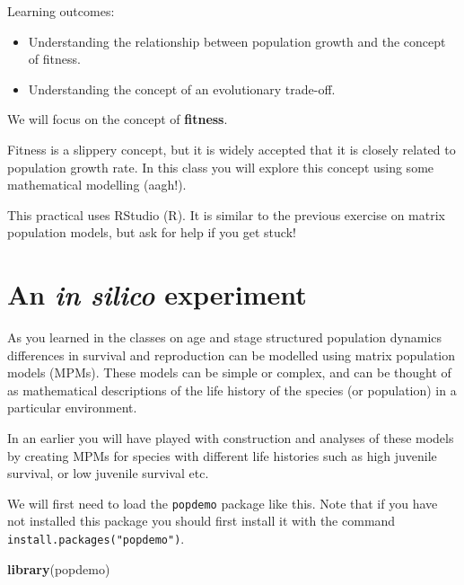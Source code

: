 \documentclass[
  a4paper]{book}
\newenvironment{Shaded}{\begin{snugshade}}{\end{snugshade}}
\newcommand{\FunctionTok}[1]{\textcolor[rgb]{0.13,0.29,0.53}{\textbf{#1}}}
\newcommand{\NormalTok}[1]{#1}
\providecommand{\tightlist}{%
  \setlength{\itemsep}{0pt}\setlength{\parskip}{0pt}}
\begin{document}
\begin{do-something}
Learning outcomes:

\begin{itemize}
\tightlist
\item
  Understanding the relationship between population growth and the
  concept of fitness.
\item
  Understanding the concept of an evolutionary trade-off.
\end{itemize}
\end{do-something}

We will focus on the concept of \textbf{fitness}.

Fitness is a slippery concept, but it is widely accepted that it is closely related to population growth rate. In this class you will explore this concept using some mathematical modelling (aagh!).

\begin{do-something}
This practical uses RStudio (R). It is similar to the previous exercise
on matrix population models, but ask for help if you get stuck!
\end{do-something}

\section{\texorpdfstring{An \emph{in silico} experiment}{An in silico experiment}}\label{an-in-silico-experiment}

As you learned in the classes on age and stage structured population dynamics differences in survival and reproduction can be modelled using matrix population models (MPMs). These models can be simple or complex, and can be thought of as mathematical descriptions of the life history of the species (or population) in a particular environment.

In an earlier you will have played with construction and analyses of these models by creating MPMs for species with different life histories such as high juvenile survival, or low juvenile survival etc.

We will first need to load the \texttt{popdemo} package like this. Note that if you have not installed this package you should first install it with the command \texttt{install.packages("popdemo")}.

\begin{Shaded}
\begin{Highlighting}[]
\FunctionTok{library}\NormalTok{(popdemo)}
\end{Highlighting}
\end{Shaded}
\end{document}
